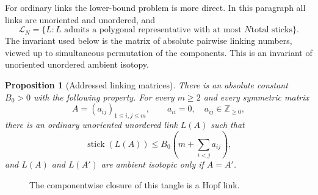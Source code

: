 \documentclass[11pt]{article}
\newtheorem{proposition}{Proposition}
\theoremstyle{remark}
\theoremstyle{plain}
\newcommand{\Lcal}{\mathcal{L}}
\begin{document}
For ordinary links the lower-bound problem is more direct.  In this paragraph
all links are unoriented and unordered, and
\[
    \Lcal_N
    =
    \{L:\text{\(L\) admits a polygonal representative with at most \(N\)
    total sticks}\}.
\]
The invariant used below is the matrix of absolute pairwise linking numbers,
viewed up to simultaneous permutation of the components.  This is an invariant
of unoriented unordered ambient isotopy.

\begin{proposition}[Addressed linking matrices]\label{prop:addressed-linking}
There is an absolute constant \(B_0>0\) with the following property.  For every
\(m\ge2\) and every symmetric matrix
\[
    A=(a_{ij})_{1\le i,j\le m},\qquad
    a_{ii}=0,\quad a_{ij}\in\mathbb Z_{\ge0},
\]
there is an ordinary unoriented unordered link \(L(A)\) such that
\[
    \operatorname{stick}(L(A))
    \le
    B_0\left(m+\sum_{i<j}a_{ij}\right),
\]
and \(L(A)\) and \(L(A')\) are ambient isotopic only if \(A=A'\).
\end{proposition}

\begin{figure}[ht]
\centering
{}
\caption{The componentwise closure of this tangle is a Hopf link.}
\label{fig:hopf-clasp}
\end{figure}
\end{document}
